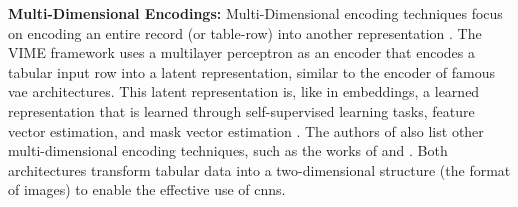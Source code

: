 \textbf{Multi-Dimensional Encodings:}
Multi-Dimensional encoding techniques focus on encoding an entire record (or table-row) into another representation \cite{borisov2022DeepNeuralNetworks}.
The VIME framework \cite{yoon2020VIMEExtendingSuccess} uses a multilayer perceptron as an encoder that encodes a tabular input row into a latent representation, 
similar to the encoder of famous \gls{vae} \cite{kingma2013AutoEncodingVariationalBayes} architectures.
This latent representation is, like in embeddings, a learned representation that is learned through self-supervised learning tasks, feature vector estimation, and mask vector estimation \cite{yoon2020VIMEExtendingSuccess}.
The authors of \cite{borisov2022DeepNeuralNetworks} also list other multi-dimensional encoding techniques, such as the works of \cite{zhu2021ConvertingTabularData} and \cite{sun2019supertml}.
Both architectures transform tabular data into a two-dimensional structure (\eg the format of images) to enable the effective use of \glspl{cnn}.


